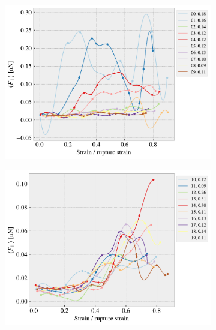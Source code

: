 \begin{figure}[H]
    \centering
    \begin{subfigure}[b]{0.49\textwidth}
        \centering
        \includegraphics[width=\textwidth]{figures/stretch_profiles/RW/SP_0_RW.pdf}
        \caption{}
    \end{subfigure}
    \hfill
    \begin{subfigure}[b]{0.49\textwidth}
        \centering
        \includegraphics[width=\textwidth]{figures/stretch_profiles/RW/SP_1_RW.pdf}
        \caption{}
    \end{subfigure}
    \hfill
    \begin{subfigure}[b]{0.49\textwidth}

\end{subfigure}
\end{figure}
